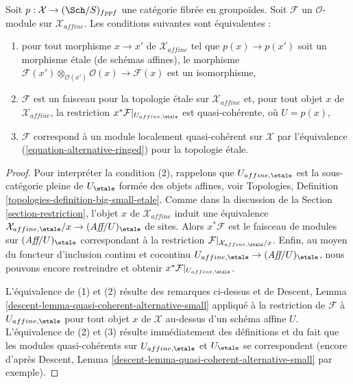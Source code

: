 \begin{lemma}
\label{lemma-locally-quasi-coherent-alternative}
Soit $p : \mathcal{X} \to (\Sch/S)_{fppf}$ une catégorie fibrée en groupoïdes.
Soit $\mathcal{F}$ un $\mathcal{O}$-module sur $\mathcal{X}_{affine}$.
Les conditions suivantes sont équivalentes :
\begin{enumerate}
\item pour tout morphisme $x \to x'$ de $\mathcal{X}_{affine}$ tel que
$p(x) \to p(x')$ soit un morphisme étale (de schémas affines), le morphisme
$\mathcal{F}(x') \otimes_{\mathcal{O}(x')} \mathcal{O}(x) \to \mathcal{F}(x)$
est un isomorphisme,
\item $\mathcal{F}$ est un faisceau pour la topologie étale sur
$\mathcal{X}_{affine}$ et, pour tout objet $x$ de $\mathcal{X}_{affine}$,
la restriction $x^*\mathcal{F}|_{U_{affine, \etale}}$ est quasi-cohérente,
où $U = p(x)$,
\item $\mathcal{F}$ correspond à un module localement quasi-cohérent
sur $\mathcal{X}$ par l'équivalence (\ref{equation-alternative-ringed})
pour la topologie étale.
\end{enumerate}
\end{lemma}

\begin{proof}
Pour interpréter la condition (2), rappelons que $U_{affine, \etale}$
est la sous-catégorie pleine de $U_\etale$ formée des objets affines, voir
Topologies, Definition \ref{topologies-definition-big-small-etale}.
Comme dans la discussion de la Section \ref{section-restriction},
l'objet $x$ de $\mathcal{X}_{affine}$ induit une équivalence
$\mathcal{X}_{affine, \etale}/x \to (\textit{Aff}/U)_\etale$ de sites.
Alors $x^*\mathcal{F}$ est le faisceau de modules sur $(\textit{Aff}/U)_\etale$
correspondant à la restriction
$\mathcal{F}|_{\mathcal{X}_{affine, \etale}/x}$.
Enfin, au moyen du foncteur d'inclusion continu et cocontinu
$U_{affine, \etale} \to (\textit{Aff}/U)_\etale$, nous pouvons encore
restreindre et obtenir $x^*\mathcal{F}|_{U_{affine, \etale}}$.

\medskip\noindent
L'équivalence de (1) et (2) résulte des remarques ci-dessus et de
Descent, Lemma \ref{descent-lemma-quasi-coherent-alternative-small}
appliqué à la restriction de $\mathcal{F}$ à $U_{affine, \etale}$
pour tout objet $x$ de $\mathcal{X}$ au-dessus d'un schéma affine $U$.
L'équivalence de (2) et (3) résulte immédiatement des définitions
et du fait que les modules quasi-cohérents sur $U_{affine, \etale}$
et $U_\etale$ se correspondent (encore d'après
Descent, Lemma \ref{descent-lemma-quasi-coherent-alternative-small}
par exemple).
\end{proof}














